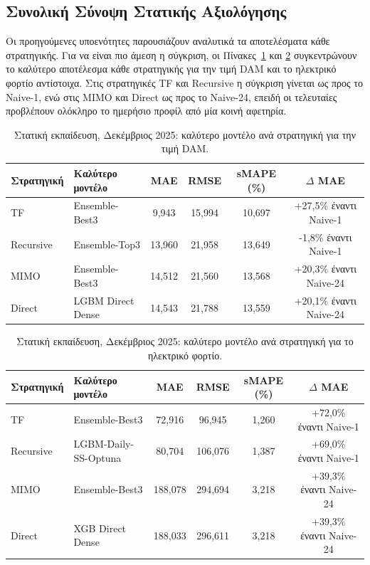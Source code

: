 \subsection{Συνολική Σύνοψη Στατικής Αξιολόγησης}
\label{subsec:static_dec_summary}

Οι προηγούμενες υποενότητες παρουσιάζουν αναλυτικά τα αποτελέσματα κάθε στρατηγικής.
Για να είναι πιο άμεση η σύγκριση, οι Πίνακες~\ref{tab:static_best_price_dec} και
\ref{tab:static_best_load_dec} συγκεντρώνουν το καλύτερο αποτέλεσμα κάθε στρατηγικής
για την τιμή DAM και το ηλεκτρικό φορτίο αντίστοιχα. Στις στρατηγικές TF και Recursive
η σύγκριση γίνεται ως προς το Naive-1, ενώ στις MIMO και Direct ως προς το Naive-24,
επειδή οι τελευταίες προβλέπουν ολόκληρο το ημερήσιο προφίλ από μία κοινή αφετηρία.

\begin{table}[H]
  \centering
  \caption{Στατική εκπαίδευση, Δεκέμβριος 2025: καλύτερο μοντέλο ανά στρατηγική για την τιμή DAM.}
  \label{tab:static_best_price_dec}
  \small
  \setlength{\tabcolsep}{4pt}
  \begin{tabular}{llcccc}
    \toprule
    \textbf{Στρατηγική} & \textbf{Καλύτερο μοντέλο} &
    \textbf{MAE} & \textbf{RMSE} & \textbf{sMAPE (\%)} &
    \textbf{$\Delta$ MAE} \\
    \midrule
    TF &
    Ensemble-Best3 &
    9,943 &
    15,994 &
    10,697 &
    +27,5\% έναντι Naive-1 \\
    Recursive &
    Ensemble-Top3 &
    13,960 &
    21,958 &
    13,649 &
    -1,8\% έναντι Naive-1 \\
    MIMO &
    Ensemble-Best3 &
    14,512 &
    21,560 &
    13,568 &
    +20,3\% έναντι Naive-24 \\
    Direct &
    LGBM Direct Dense &
    14,543 &
    21,788 &
    13,559 &
    +20,1\% έναντι Naive-24 \\
    \bottomrule
  \end{tabular}
\end{table}

\begin{table}[H]
  \centering
  \caption{Στατική εκπαίδευση, Δεκέμβριος 2025: καλύτερο μοντέλο ανά στρατηγική για το ηλεκτρικό φορτίο.}
  \label{tab:static_best_load_dec}
  \small
  \setlength{\tabcolsep}{4pt}
  \begin{tabular}{llcccc}
    \toprule
    \textbf{Στρατηγική} & \textbf{Καλύτερο μοντέλο} &
    \textbf{MAE} & \textbf{RMSE} & \textbf{sMAPE (\%)} &
    \textbf{$\Delta$ MAE} \\
    \midrule
    TF &
    Ensemble-Best3 &
    72,916 &
    96,945 &
    1,260 &
    +72,0\% έναντι Naive-1 \\
    Recursive &
    LGBM-Daily-SS-Optuna &
    80,704 &
    106,076 &
    1,387 &
    +69,0\% έναντι Naive-1 \\
    MIMO &
    Ensemble-Best3 &
    188,078 &
    294,694 &
    3,218 &
    +39,3\% έναντι Naive-24 \\
    Direct &
    XGB Direct Dense &
    188,033 &
    296,611 &
    3,218 &
    +39,3\% έναντι Naive-24 \\
    \bottomrule
  \end{tabular}
\end{table}

